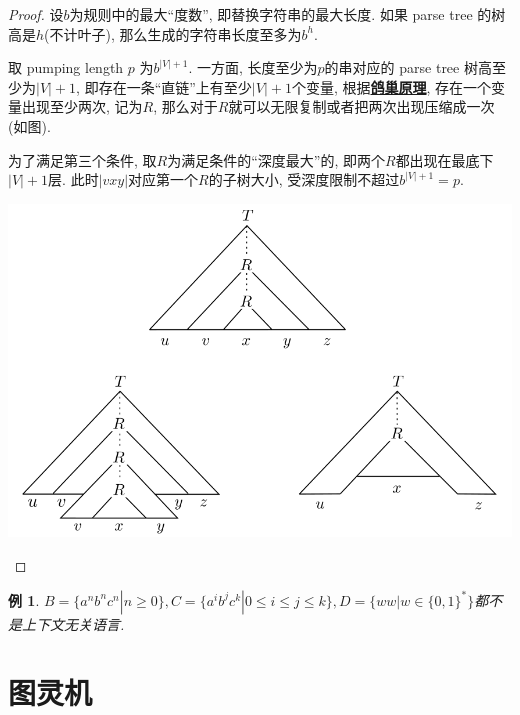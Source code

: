 \documentclass[8pt]{article}
\theoremstyle{compact}
\newtheorem{example}{例}
\def\obj#1{\textbf{\uline{#1}}}
\def\le{\leqslant}
\def\ge{\geqslant}
\begin{document}
\begin{proof}
	设$b$为规则中的最大“度数”, 即替换字符串的最大长度. 如果 parse tree 的树高是$h$(不计叶子), 那么生成的字符串长度至多为$b^h$. 

	取 pumping length $p$ 为$b^{|V|+1}$. 一方面, 长度至少为$p$的串对应的 parse tree 树高至少为$|V| + 1$, 即存在一条“直链”上有至少$|V| + 1$个变量, 根据\obj{鸽巢原理}, 存在一个变量出现至少两次, 记为$R$, 那么对于$R$就可以无限复制或者把两次出现压缩成一次(如图). 

	为了满足第三个条件, 取$R$为满足条件的“深度最大”的, 即两个$R$都出现在最底下$|V| + 1$层. 此时$|vxy|$对应第一个$R$的子树大小, 受深度限制不超过$b^{|V| + 1} = p$. 
	\begin{center}
		\includegraphics[scale=0.3]{pic/pumping_for_CFL.png}		
	\end{center}
\end{proof}
\begin{example}
	$B = \{a^nb^nc^n | n \ge 0\}, C = \{a^ib^jc^k | 0 \le i \le j \le k\}, D = \{ww | w \in \{0, 1\}^*\}$都不是上下文无关语言. 
\end{example}

\newpage
\section{图灵机}
\end{document}
